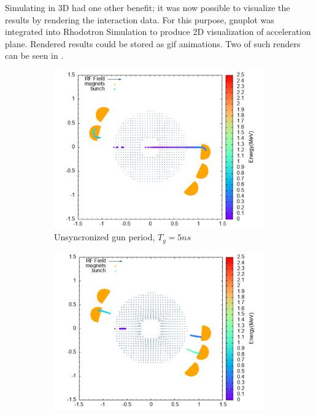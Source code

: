 \documentclass[a4paper,oneside,12pt]{report}
\numberwithin{equation}{chapter}
\begin{document}
{Simulating in 3D had one other benefit; it was now possible to visualize the results by rendering the interaction data. 
For this purpose, gnuplot was integrated into Rhodotron Simulation to produce 2D visualization of acceleration plane. 
Rendered results could be stored as gif animations. 
Two of such renders can be seen in .
\iffalse \begin{figure}[H]
    \centering
    \begin{subfigure}{0.9\textwidth}
        \centering
        \includegraphics[width=\linewidth]{./figures/rhodoSim/5ns_gnuplot.png}
        \caption*{Unsyncronized \e gun period, $T_g = 5ns$}
    \end{subfigure}
    \begin{subfigure}{0.9\textwidth}
        \centering
        \includegraphics[width=\linewidth]{./figures/rhodoSim/9_3ns_gnuplot.png}

\end{subfigure}
\end{figure}}
\end{document}
